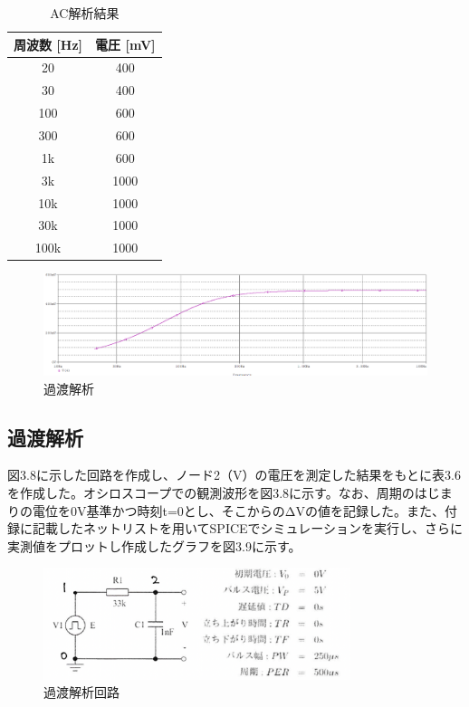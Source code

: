 \documentclass{jlreq}
\numberwithin{equation}{section}
\begin{document}
\begin{table}[H]
  \centering
  \caption{AC解析結果}
  \begin{tabular}{|c|c|}
    \hline
    周波数 [Hz] & 電圧 [mV] \\ \hline
    20 & 400 \\ \hline
    30 & 400 \\ \hline
    100 & 600 \\ \hline
    300 & 600 \\ \hline
    1k & 600 \\ \hline
    3k & 1000 \\ \hline
    10k & 1000 \\ \hline
    30k & 1000 \\ \hline
    100k & 1000 \\ \hline
  \end{tabular}
\end{table}

\begin{figure}[H]
  \centering
  \includegraphics[width=\textwidth]{assets/ackaisekiplot.png}
  \caption{過渡解析}
\end{figure}

\subsection{過渡解析}
図3.8に示した回路を作成し、ノード2（V）の電圧を測定した結果をもとに表3.6を作成した。オシロスコープでの観測波形を図3.8に示す。なお、周期のはじまりの電位を0V基準かつ時刻t=0とし、そこからのΔVの値を記録した。また、付録に記載したネットリストを用いてSPICEでシミュレーションを実行し、さらに実測値をプロットし作成したグラフを図3.9に示す。

\begin{figure}[H]
  \centering
  \includegraphics[width=0.8\textwidth]{assets/katokaisekikairo.png}
  \caption{過渡解析回路}
\end{figure}
\end{document}
